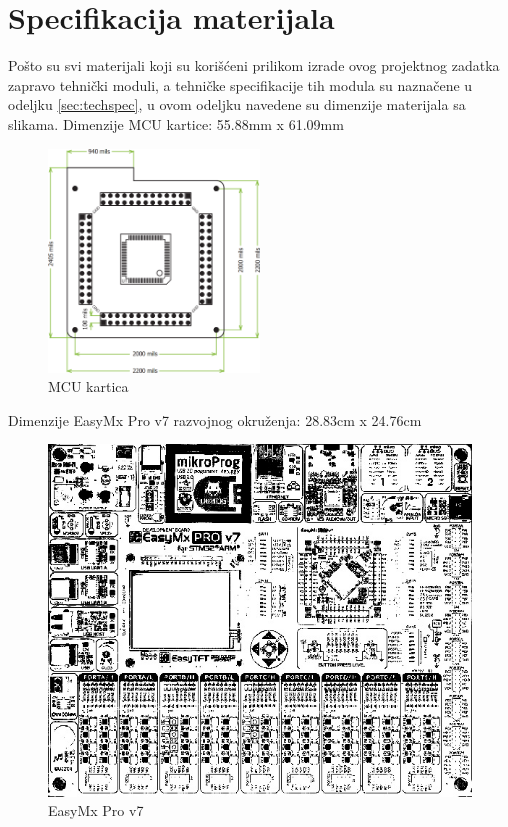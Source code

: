 \documentclass[a4paper, 12pt, oneside, titlepage]{article}
\begin{document}
    \section{Specifikacija materijala}
    Pošto su svi materijali koji su korišćeni prilikom izrade ovog projektnog zadatka zapravo tehnički moduli, a tehničke specifikacije tih modula su naznačene u odeljku \ref{sec:techspec},
    u ovom odeljku navedene su dimenzije materijala sa slikama.
    \bigbreak
    \noindent Dimenzije MCU kartice: 55.88mm x 61.09mm
    \begin{figure}[H]
        \centering
        \includegraphics[width=0.5\textwidth]{slike/dim_mcu_card}
        \caption{MCU kartica}
        \label{fig:dim_mcu_card} %
    \end{figure}
    \pagebreak
    
    \noindent Dimenzije EasyMx Pro v7 razvojnog okruženja: 28.83cm x 24.76cm
    \begin{figure}[H]
        \centering
        \includegraphics[width=\textwidth]{slike/dim_easymx}
        \caption{EasyMx Pro v7}
        \label{fig:dim_easymx} %
    \end{figure}
    
\end{document}
